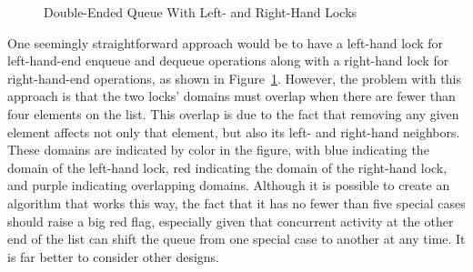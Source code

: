 \begin{figure}[tb]
\begin{center}
\end{center}
\caption{Double-Ended Queue With Left- and Right-Hand Locks}
\label{fig:SMPdesign:Double-Ended Queue With Left- and Right-Hand Locks}
\end{figure}

One seemingly straightforward approach would be to have a left-hand lock
for left-hand-end enqueue and dequeue operations along with a right-hand
lock for right-hand-end operations, as shown in
Figure~\ref{fig:SMPdesign:Double-Ended Queue With Left- and Right-Hand Locks}.
However, the problem with this approach is that the two locks'
domains must overlap when there are fewer than four elements on the
list.
This overlap is due to the fact that removing any given element affects
not only that element, but also its left- and right-hand neighbors.
These domains are indicated by color in the figure, with blue indicating
the domain of the left-hand lock, red indicating the domain of the right-hand
lock, and purple indicating overlapping domains.
Although it is possible to create an algorithm that works this way,
the fact that it has no fewer than five special cases should raise
a big red flag, especially given that concurrent activity at the other
end of the list can shift the queue from one special case to another
at any time.
It is far better to consider other designs.

